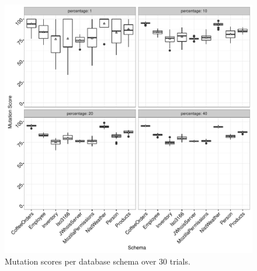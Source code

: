 \begin{figure}[!t]
  \centering
    \hspace*{-1em}\includegraphics[scale = 0.5]{graphs/schema_vs_ms.pdf}
  \caption{\label{fig:graph}Mutation scores per database schema over 30 trials.}


\vspace{-1.8em}
\end{figure}
